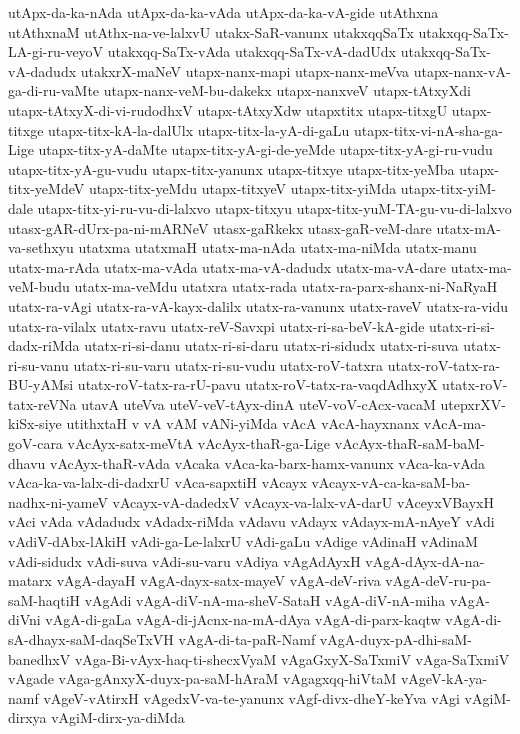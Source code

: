 {utApx-da-ka-nAda
utApx-da-ka-vAda
utApx-da-ka-vA-gide
utAthxna
utAthxnaM
utAthx-na-ve-lalxvU
utakx-SaR-vanunx
utakxqqSaTx
utakxqq-SaTx-LA-gi-ru-veyoV
utakxqq-SaTx-vAda
utakxqq-SaTx-vA-dadUdx
utakxqq-SaTx-vA-dadudx
utakxrX-maNeV
utapx-nanx-mapi
utapx-nanx-meVva
utapx-nanx-vA-ga-di-ru-vaMte
utapx-nanx-veM-bu-dakekx
utapx-nanxveV
utapx-tAtxyXdi
utapx-tAtxyX-di-vi-rudodhxV
utapx-tAtxyXdw
utapxtitx
utapx-titxgU
utapx-titxge
utapx-titx-kA-la-dalUlx
utapx-titx-la-yA-di-gaLu
utapx-titx-vi-nA-sha-ga-Lige
utapx-titx-yA-daMte
utapx-titx-yA-gi-de-yeMde
utapx-titx-yA-gi-ru-vudu
utapx-titx-yA-gu-vudu
utapx-titx-yanunx
utapx-titxye
utapx-titx-yeMba
utapx-titx-yeMdeV
utapx-titx-yeMdu
utapx-titxyeV
utapx-titx-yiMda
utapx-titx-yiM-dale
utapx-titx-yi-ru-vu-di-lalxvo
utapx-titxyu
utapx-titx-yuM-TA-gu-vu-di-lalxvo
utasx-gAR-dUrx-pa-ni-mARNeV
utasx-gaRkekx
utasx-gaR-veM-dare
utatx-mA-va-sethxyu
utatxma
utatxmaH
utatx-ma-nAda
utatx-ma-niMda
utatx-manu
utatx-ma-rAda
utatx-ma-vAda
utatx-ma-vA-dadudx
utatx-ma-vA-dare
utatx-ma-veM-budu
utatx-ma-veMdu
utatxra
utatx-rada
utatx-ra-parx-shanx-ni-NaRyaH
utatx-ra-vAgi
utatx-ra-vA-kayx-dalilx
utatx-ra-vanunx
utatx-raveV
utatx-ra-vidu
utatx-ra-vilalx
utatx-ravu
utatx-reV-Savxpi
utatx-ri-sa-beV-kA-gide
utatx-ri-si-dadx-riMda
utatx-ri-si-danu
utatx-ri-si-daru
utatx-ri-sidudx
utatx-ri-suva
utatx-ri-su-vanu
utatx-ri-su-varu
utatx-ri-su-vudu
utatx-roV-tatxra
utatx-roV-tatx-ra-BU-yAMsi
utatx-roV-tatx-ra-rU-pavu
utatx-roV-tatx-ra-vaqdAdhxyX
utatx-roV-tatx-reVNa
utavA
uteVva
uteV-veV-tAyx-dinA
uteV-voV-cAcx-vacaM
utepxrXV-kiSx-siye
utithxtaH
v
vA
vAM
vANi-yiMda
vAcA
vAcA-hayxnanx
vAcA-ma-goV-cara
vAcAyx-satx-meVtA
vAcAyx-thaR-ga-Lige
vAcAyx-thaR-saM-baM-dhavu
vAcAyx-thaR-vAda
vAcaka
vAca-ka-barx-hamx-vanunx
vAca-ka-vAda
vAca-ka-va-lalx-di-dadxrU
vAca-sapxtiH
vAcayx
vAcayx-vA-ca-ka-saM-ba-nadhx-ni-yameV
vAcayx-vA-dadedxV
vAcayx-va-lalx-vA-darU
vAceyxVBayxH
vAci
vAda
vAdadudx
vAdadx-riMda
vAdavu
vAdayx
vAdayx-mA-nAyeY
vAdi
vAdiV-dAbx-lAkiH
vAdi-ga-Le-lalxrU
vAdi-gaLu
vAdige
vAdinaH
vAdinaM
vAdi-sidudx
vAdi-suva
vAdi-su-varu
vAdiya
vAgAdAyxH
vAgA-dAyx-dA-na-matarx
vAgA-dayaH
vAgA-dayx-satx-mayeV
vAgA-deV-riva
vAgA-deV-ru-pa-saM-haqtiH
vAgAdi
vAgA-diV-nA-ma-sheV-SataH
vAgA-diV-nA-miha
vAgA-diVni
vAgA-di-gaLa
vAgA-di-jAcnx-na-mA-dAya
vAgA-di-parx-kaqtw
vAgA-di-sA-dhayx-saM-daqSeTxVH
vAgA-di-ta-paR-Namf
vAgA-duyx-pA-dhi-saM-banedhxV
vAga-Bi-vAyx-haq-ti-shecxVyaM
vAgaGxyX-SaTxmiV
vAga-SaTxmiV
vAgade
vAga-gAnxyX-duyx-pa-saM-hAraM
vAgagxqq-hiVtaM
vAgeV-kA-ya-namf
vAgeV-vAtirxH
vAgedxV-va-te-yanunx
vAgf-divx-dheY-keYva
vAgi
vAgiM-dirxya
vAgiM-dirx-ya-diMda
}

